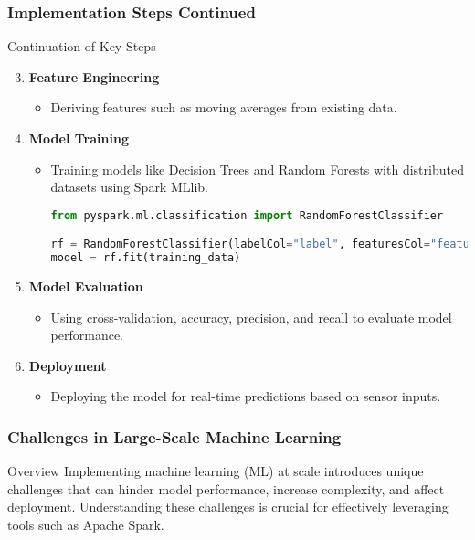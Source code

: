\documentclass[aspectratio=169]{beamer}
\begin{document}
\begin{frame}[fragile]
    \frametitle{Implementation Steps Continued}
    \begin{block}{Continuation of Key Steps}
        \begin{enumerate}
            \setcounter{enumi}{2}
            \item \textbf{Feature Engineering}
                \begin{itemize}
                    \item Deriving features such as moving averages from existing data.
                \end{itemize}
            \item \textbf{Model Training}
                \begin{itemize}
                    \item Training models like Decision Trees and Random Forests with distributed datasets using Spark MLlib.
                    \begin{lstlisting}[language=Python]
from pyspark.ml.classification import RandomForestClassifier

rf = RandomForestClassifier(labelCol="label", featuresCol="features")
model = rf.fit(training_data)
                    \end{lstlisting}
                \end{itemize}
            \item \textbf{Model Evaluation}
                \begin{itemize}
                    \item Using cross-validation, accuracy, precision, and recall to evaluate model performance.
                \end{itemize}
            \item \textbf{Deployment}
                \begin{itemize}
                    \item Deploying the model for real-time predictions based on sensor inputs.
                \end{itemize}
        \end{enumerate}
    \end{block}
\end{frame}

\begin{frame}
    \frametitle{Challenges in Large-Scale Machine Learning}
    \begin{block}{Overview}
        Implementing machine learning (ML) at scale introduces unique challenges that can hinder model performance, increase complexity, and affect deployment. Understanding these challenges is crucial for effectively leveraging tools such as Apache Spark.
    \end{block}
\end{frame}
\end{document}

